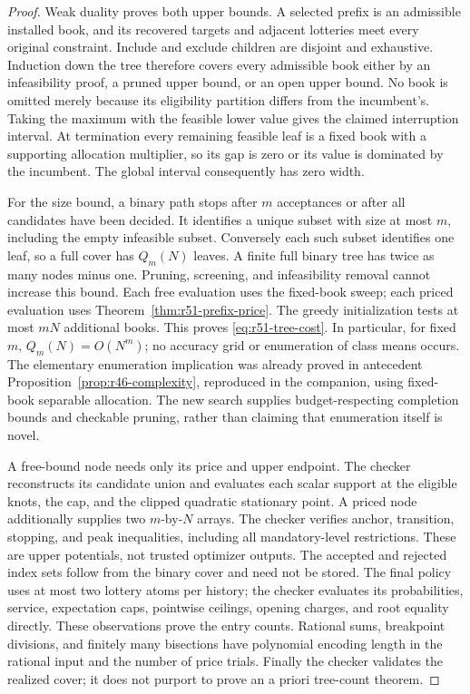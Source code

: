 \begin{proof}
Weak duality proves both upper bounds. A selected prefix is an admissible installed book, and its recovered targets and adjacent lotteries meet every original constraint. Include and exclude children are disjoint and exhaustive. Induction down the tree therefore covers every admissible book either by an infeasibility proof, a pruned upper bound, or an open upper bound. No book is omitted merely because its eligibility partition differs from the incumbent's. Taking the maximum with the feasible lower value gives the claimed interruption interval. At termination every remaining feasible leaf is a fixed book with a supporting allocation multiplier, so its gap is zero or its value is dominated by the incumbent. The global interval consequently has zero width.

For the size bound, a binary path stops after $m$ acceptances or after all candidates have been decided. It identifies a unique subset with size at most $m$, including the empty infeasible subset. Conversely each such subset identifies one leaf, so a full cover has $Q_m(N)$ leaves. A finite full binary tree has twice as many nodes minus one. Pruning, screening, and infeasibility removal cannot increase this bound. Each free evaluation uses the fixed-book sweep; each priced evaluation uses Theorem~\ref{thm:r51-prefix-price}. The greedy initialization tests at most $mN$ additional books. This proves \eqref{eq:r51-tree-cost}. In particular, for fixed $m$, $Q_m(N)=O(N^m)$; no accuracy grid or enumeration of class means occurs. The elementary enumeration implication was already proved in antecedent Proposition~\ref{prop:r46-complexity}, reproduced in the companion, using fixed-book separable allocation. The new search supplies budget-respecting completion bounds and checkable pruning, rather than claiming that enumeration itself is novel.

A free-bound node needs only its price and upper endpoint. The checker reconstructs its candidate union and evaluates each scalar support at the eligible knots, the cap, and the clipped quadratic stationary point. A priced node additionally supplies two $m$-by-$N$ arrays. The checker verifies anchor, transition, stopping, and peak inequalities, including all mandatory-level restrictions. These are upper potentials, not trusted optimizer outputs. The accepted and rejected index sets follow from the binary cover and need not be stored. The final policy uses at most two lottery atoms per history; the checker evaluates its probabilities, service, expectation caps, pointwise ceilings, opening charges, and root equality directly. These observations prove the entry counts. Rational sums, breakpoint divisions, and finitely many bisections have polynomial encoding length in the rational input and the number of price trials. Finally the checker validates the realized cover; it does not purport to prove an a priori tree-count theorem.
\end{proof}

